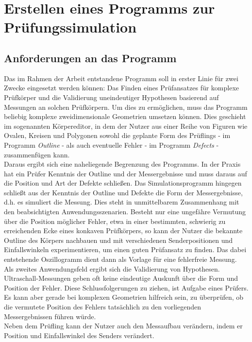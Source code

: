 \documentclass[reducespace,stylepage,semiarbeit]{spezidoc}
\begin{document}
\newpage
\section{Erstellen eines Programms zur Prüfungssimulation }\label{sec:sim}

\subsection{Anforderungen an das Programm}

Das im Rahmen der Arbeit entstandene Programm soll in erster Linie für zwei Zwecke eingesetzt werden können: Das Finden eines Prüfansatzes für komplexe Prüfkörper und die Validierung uneindeutiger Hypothesen basierend auf Messungen an solchen Prüfkörpern.
Um dies zu ermöglichen, muss das Programm beliebig komplexe zweidimensionale Geometrien umsetzen können. 
Dies geschieht im sogenannten Körpereditor, in dem der Nutzer aus einer Reihe von Figuren wie Ovalen, Kreisen und Polygonen sowohl die geplante Form des Prüflings - im Programm \textit{Outline} - als auch eventuelle Fehler - im Programm \textit{Defects} - zusammenfügen kann. \\
Daraus ergibt sich eine naheliegende Begrenzung des Programms. 
In der Praxis hat ein Prüfer Kenntnis der Outline und der Messergebnisse und muss daraus auf die Position und Art der Defekte schließen. 
Das Simulationsprogramm hingegen schließt aus der Kenntnis der Outline und Defekte die Form der Messergebnisse, d.h. es simuliert die Messung. 
Dies steht in unmittelbarem Zusammenhang mit den beabsichtigten Anwendungsszenarien.
Besteht nur eine ungefähre Vermutung über die Position möglicher Fehler, etwa in einer bestimmten, schwierig zu erreichenden Ecke eines konkaven Prüfkörpers, so kann der Nutzer die bekannte Outline des Körpers nachbauen und mit verschiedenen Senderpositionen und Einfallswinkeln experimentieren, um einen guten Prüfansatz zu finden. 
Das dabei entstehende Oszillogramm dient dann als Vorlage für eine fehlerfreie Messung. \\
Als zweites Anwendungsfeld ergibt sich die Validierung von Hypothesen. 
Ultraschall-Messungen geben oft keine eindeutige Auskunft über die Form und Position der Fehler. 
Diese Schlussfolgerungen zu ziehen, ist Aufgabe eines Prüfers. 
Es kann aber gerade bei komplexen Geometrien hilfreich sein, zu überprüfen, ob die vermutete Position des Fehlers tatsächlich zu den vorliegenden Messergebnissen führen würde. \\
Neben dem Prüfling kann der Nutzer auch den Messaufbau verändern, indem er Position und Einfallswinkel des Senders verändert. 
\end{document}
